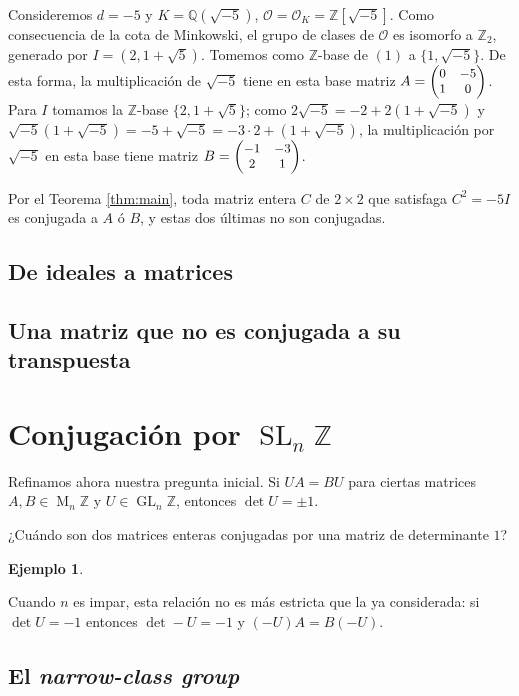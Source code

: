 \documentclass[11pt,a4paper]{amsart}
\newcommand{\Q}{\mathbb{Q}}
\newcommand{\Z}{\mathbb{Z}}
\renewcommand{\emph}[1]{\textbf{\textit{#1}}}
\DeclareMathOperator{\M}{M}
\DeclareMathOperator{\GL}{GL}
\DeclareMathOperator{\SL}{SL}
\theoremstyle{plain}
\newtheorem{ej}{Ejemplo}
\renewcommand{\O}{\mathcal{O}}
\begin{document}
Consideremos $d = -5$ y $K = \Q(\sqrt{-5})$, $\O = \O_K = \Z[\sqrt{-5}]$.
Como consecuencia de la cota de Minkowski,
el grupo de clases de $\O$ es isomorfo a $\Z_2$, generado por
$I = (2,1+\sqrt{5})$. Tomemos como $\Z$-base de $(1)$ a
$\{1,\sqrt{-5}\}$. De esta forma, la multiplicación de $\sqrt{-5}$
tiene en esta base matriz $A =
\small\begin{pmatrix}0 & -5\\ 1 & 0\end{pmatrix}$.
Para $I$ tomamos la $\Z$-base $\{2,1+\sqrt{5}\}$;
como $2\sqrt{-5} = -2 + 2(1+\sqrt{-5})$ y $\sqrt{-5}(1+\sqrt{-5}) = -5 +
\sqrt{-5} = -3 \cdot 2 + (1+\sqrt{-5})$, la multiplicación
por $\sqrt{-5}$ en esta base tiene matriz $B = \small\begin{pmatrix}
-1 & -3\\ 2 & 1 \end{pmatrix}$.

Por el Teorema \ref{thm:main}, toda matriz entera $C$
de $2 \times 2$ que satisfaga $C^2 = -5 I$ es conjugada a $A$ ó $B$,
y estas dos últimas no son conjugadas.

\subsection{De ideales a matrices}

\subsection{Una matriz que no es conjugada a su transpuesta}

\section{Conjugación por $\SL_n \Z$}

Refinamos ahora nuestra pregunta inicial. Si $UA = BU$
para ciertas matrices $A,B \in \M_n \Z$ y $U \in \GL_n \Z$,
entonces $\det U = \pm 1$.

¿Cuándo son dos matrices enteras
conjugadas por una matriz de determinante $1$?

\begin{ej}

\end{ej}

Cuando $n$ es impar, esta relación no es más estricta que la ya
considerada: si $\det U = -1$ entonces $\det -U = -1$ y $(-U)A = B(-U)$.

\subsection{El \emph{narrow-class group}}
\end{document}
